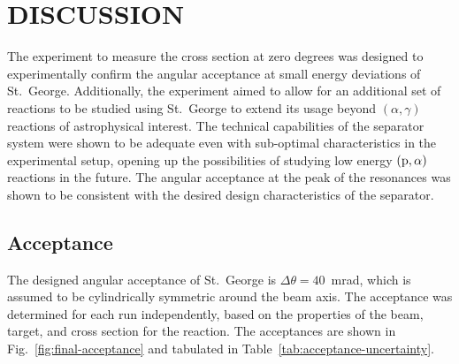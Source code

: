 
\chapter{DISCUSSION}
\label{ch:discussion}

The experiment to measure the \alpa{} cross section at zero degrees was
designed to experimentally confirm the angular acceptance at small
energy deviations of St.\ George. Additionally, the experiment aimed to
allow for an additional set of reactions to be studied using St.\ George
to extend its usage beyond $(\alpha,\gamma)$ reactions of astrophysical
interest. The technical capabilities of the separator system were shown
to be adequate even with sub-optimal characteristics in the experimental
setup, opening up the possibilities of studying low energy $({\rm
p},\alpha)$ reactions in the future. The angular acceptance at the peak
of the resonances was shown to be consistent with the desired design
characteristics of the separator.


\section{Acceptance}

The designed angular acceptance of St.\ George is
$\Delta\theta = 40$~mrad, which is assumed to be cylindrically symmetric
around the beam axis. The acceptance was determined for each run
independently, based on the properties of the beam, target, and cross
section for the \alpa{} reaction. The acceptances are shown in
Fig.~\ref{fig:final-acceptance} and tabulated in
Table~\ref{tab:acceptance-uncertainty}.

